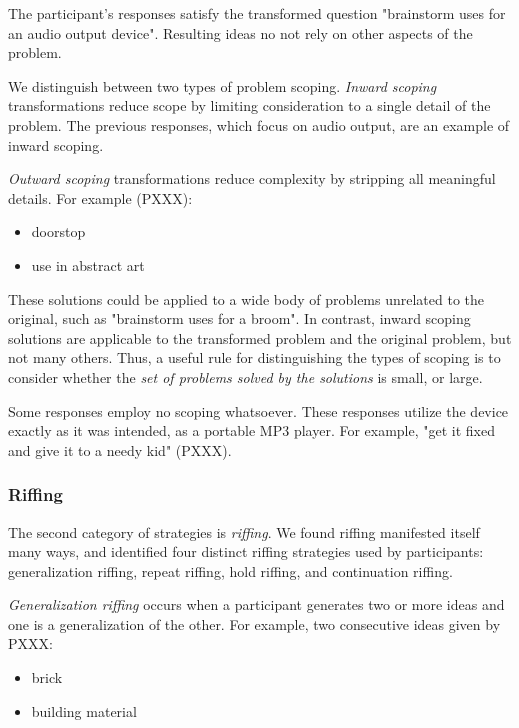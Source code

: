 The participant's responses satisfy the transformed question "brainstorm uses for an audio output device". Resulting ideas no not rely on other aspects of the problem.

We distinguish between two types of problem scoping. \emph{Inward scoping} transformations reduce scope by limiting consideration to a single detail of the problem. The previous responses, which focus on audio output, are an example of inward scoping.

\emph{Outward scoping} transformations reduce complexity by stripping all meaningful details. For example (PXXX):

\begin{itemize}
    \item doorstop
    \item use in abstract art
\end{itemize}

These solutions could be applied to a wide body of problems unrelated to the original, such as "brainstorm uses for a broom".
In contrast, inward scoping solutions are applicable to the transformed problem and the original problem, but not many others. Thus, a useful rule for distinguishing the types of scoping is to consider whether the \emph{set of problems solved by the solutions} is small, or large.

Some responses employ no scoping whatsoever. These responses utilize the device exactly as it was intended, as a portable MP3 player. For example, "get it fixed and give it to a needy kid" (PXXX).

\subsubsection{Riffing}

The second category of strategies is \emph{riffing}.
We found riffing manifested itself many ways, and identified four distinct riffing strategies used by participants: generalization riffing, repeat riffing, hold riffing, and continuation riffing. 

\emph{Generalization riffing} occurs when a participant generates two or more ideas and one is a generalization of the other. For example, two consecutive ideas given by PXXX:

\begin{itemize}
    \item brick
    \item building material
\end{itemize}

